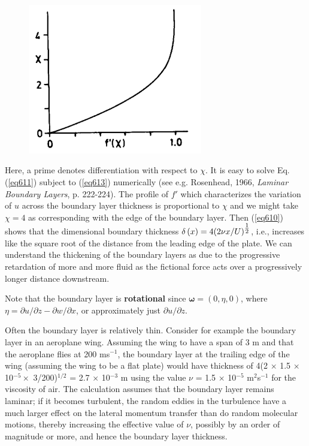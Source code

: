 \documentclass[10pt]{report}
\begin{document}
\begin{figure}
\centerline{\includegraphics[width=3in]{Section62.pdf}}
\caption{ }
\label{fig4.2}
\end{figure}

Here, a prime denotes differentiation with respect to $\chi $. It is easy to
solve Eq. (\ref{eq611}) subject to (\ref{eq613}) numerically (see e.g. Rosenhead, 1966,
\textit{Laminar Boundary Layers}, p. 222-224). The profile of $f'$ which characterizes the variation of $u$
across the boundary layer thickness is proportional to $\chi $ and we might
take $\chi  = 4$ as corresponding with the edge of the boundary layer. Then
(\ref{eq610}) shows that the dimensional boundary thickness $\delta \left( x
\right)=4(2\nu x/ U)^{\textstyle{1 \over 2}}$, i.e.,
increases like the square root of the distance from the leading edge of the
plate. We can understand the thickening of the boundary layers as due to the
progressive retardation of more and more fluid as the fictional force acts
over a progressively longer distance downstream.

Note that the boundary layer is \textbf{rotational} since ${\bm\omega}
= (0, \eta , 0)$, where $\eta ={\partial u} / {\partial
z-}{\partial w}/{\partial x}$, or approximately just
${\partial u}/ {\partial z}$.

Often the boundary layer is relatively thin. Consider for example the
boundary layer in an aeroplane wing. Assuming the wing to have a span of 3 m
and that the aeroplane flies at 200 ms$^{-1}$, the boundary layer at the
trailing edge of the wing (assuming the wing to be a flat plate) would have
thickness of 4(2 $\times $ 1.5 $\times $ 10$^{-5 }\times $ 3/200)$^{1/2}$
= 2.7 $\times $ 10$^{-3}$ m using the value $\nu $ = 1.5 $\times $ 10$^{-5}$
m$^{2}$s$^{-1}$ for the viscosity of air. The calculation assumes that the
boundary layer remains laminar; if it becomes turbulent, the random eddies
in the turbulence have a much larger effect on the lateral momentum transfer
than do random molecular motions, thereby increasing the effective value of
$\nu $, possibly by an order of magnitude or more, and hence the boundary
layer thickness.
\end{document}
